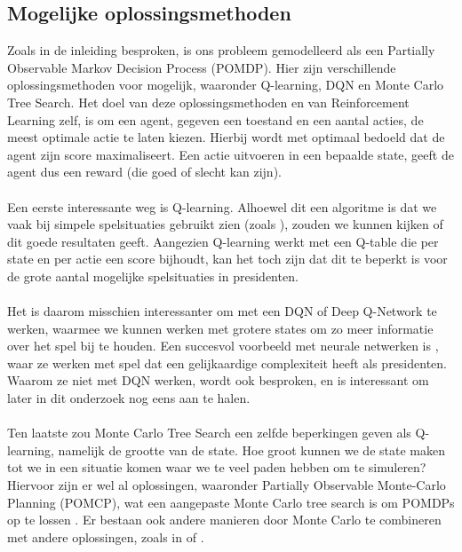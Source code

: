 \documentclass[11pt]{article}
\begin{document}
\subsection{Mogelijke oplossingsmethoden}
Zoals in de inleiding besproken, is ons probleem gemodelleerd als  een Partially Observable Markov Decision Process (POMDP). Hier zijn verschillende oplossingsmethoden voor mogelijk, waaronder Q-learning, DQN en Monte Carlo Tree Search. Het doel van deze oplossingsmethoden en van Reinforcement Learning zelf, is om een agent, gegeven een toestand en een aantal acties, de meest optimale actie te laten kiezen. Hierbij wordt met optimaal bedoeld dat de agent zijn score maximaliseert. Een actie uitvoeren in een bepaalde state, geeft de agent dus een reward (die goed of slecht kan zijn).\\\\ 
Een eerste interessante weg is Q-learning. Alhoewel dit een algoritme is dat we vaak bij simpele spelsituaties gebruikt zien (zoals \cite{simple-qlearning}), zouden we kunnen kijken of dit goede resultaten geeft. Aangezien Q-learning werkt met een Q-table die per state en per actie een score bijhoudt, kan het toch zijn dat dit te beperkt is voor de grote aantal mogelijke spelsituaties in presidenten. \\\\
Het is daarom misschien interessanter om met een DQN of Deep Q-Network te werken, waarmee we kunnen werken met grotere states om zo meer informatie over het spel bij te houden. Een succesvol voorbeeld met neurale netwerken is \cite{nn-paper}, waar ze werken met spel dat een gelijkaardige complexiteit heeft als presidenten. Waarom ze niet met DQN werken, wordt ook besproken, en is interessant om later in dit onderzoek nog eens aan te halen. \\\\
Ten laatste zou Monte Carlo Tree Search een zelfde beperkingen geven als Q-learning, namelijk de grootte van de state. Hoe groot kunnen we de state maken tot we in een situatie komen waar we te veel paden hebben om te simuleren? Hiervoor zijn er wel al oplossingen, waaronder Partially Observable Monte-Carlo Planning (POMCP), wat een aangepaste Monte Carlo tree search is om POMDPs op te lossen \cite{mct-1}. Er bestaan ook andere manieren door Monte Carlo te combineren met andere oplossingen, zoals in \cite{mct-2} of \cite{mct-3}.
\end{document}
